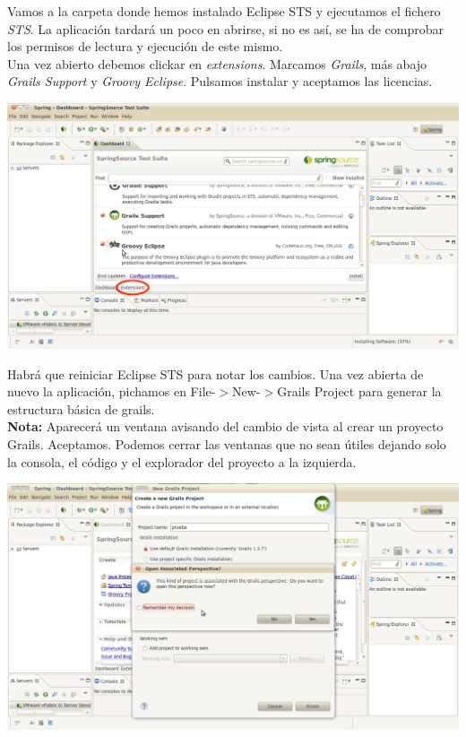 \documentclass[a4paper,12pt,spanish]{article}
\begin{document}
Vamos a la carpeta donde hemos instalado Eclipse STS y ejecutamos el fichero {\it STS}. La aplicación tardará un poco en abrirse, si no es así, se ha de comprobar los permisos de lectura y ejecución de este mismo.\\

Una vez abierto debemos clickar en {\it extensions}. Marcamos {\it Grails}, más abajo {\it Grails Support} y {\it Groovy Eclipse}. Pulsamos instalar y aceptamos las licencias.

\begin{center}
\includegraphics[scale=0.35]{ide9}
\end{center}

Habrá que reiniciar Eclipse STS para notar los cambios. Una vez abierta de nuevo la aplicación, pichamos en File-$>$New-$>$Grails Project para generar la estructura básica de grails.\\ 

{\bf Nota:} Aparecerá un ventana avisando del cambio de vista al crear un proyecto Grails. Aceptamos. Podemos cerrar las ventanas que no sean útiles dejando solo la consola, el código y el explorador del proyecto a la izquierda.

\begin{center}
\includegraphics[scale=0.35]{ide10}
\end{center}
\end{document}
